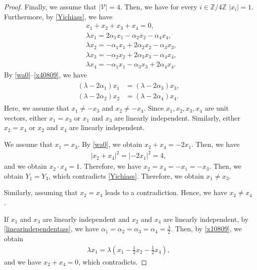 \documentclass[10pt,a4paper]{amsart}
\numberwithin{equation}{section}
\begin{document}
\begin{proof}
Finally, we assume that $|\mathcal{V}|=4$. Then, we have for every $i\in \mathbb{Z}/4\mathbb{Z}$ $|x_i|=1$. Furthermore, by \eqref{Yichiass}, we have
\begin{align}
&x_1+x_2+x_3+x_4=0, \label{wa0}
\\
&\lambda x_1=2\alpha_1x_1-\alpha_2x_2-\alpha_4x_4, \label{x10809}
\\
&\lambda x_2=-\alpha_1x_1+2\alpha_2x_2-\alpha_3x_3, \label{x20809}
\\
&\lambda x_3=-\alpha_2x_2+2\alpha_3x_3-\alpha_4x_4, \label{x30809}
\\
&\lambda x_4=-\alpha_1 x_1-\alpha_3x_3+2\alpha_4x_4. \label{x40809}
\end{align}
By \eqref{wa0}--\eqref{x40809}, we have
\begin{align}\label{linearindependentass}
\begin{aligned}
(\lambda-2\alpha_1)x_1&=(\lambda-2\alpha_3)x_3,
\\
(\lambda-2\alpha_2)x_2&=(\lambda-2\alpha_4)x_4.
\end{aligned}
\end{align}
Here, we assume that $x_1\neq -x_3$ and $x_2\neq -x_4$. Since $x_1,x_2,x_3,x_4$ are unit vectors, either $x_1=x_3$ or $x_1$ and $x_3$ are linearly independent. Similarly, either $x_2=x_4$ or $x_2$ and $x_4$ are linearly independent.

We assume that $x_1=x_3$. By \eqref{wa0}, we obtain $x_2+x_4=-2x_1$. Then, we have
\begin{align*}
\left|x_2+x_4\right|^2=\left|-2x_1\right|^2=4,
\end{align*}
and we obtain $x_2\cdot x_4=1$. Therefore, we have $x_2=x_4=-x_1=-x_3$. Then, we obtain $Y_1=Y_3$, which contradicts \eqref{Yichiass}. Therefore, we obtain $x_1\neq x_3$.

Similarly, assuming that $x_2=x_4$ leads to a contradiction. Hence, we have $x_2\neq x_4$.


If $x_1$ and $x_3$ are linearly independent and $x_2$ and $x_4$ are linearly independent, by \eqref{linearindependentass}, we have $\alpha_1=\alpha_2=\alpha_3=\alpha_4=\frac{\lambda}{2}$. Then, by \eqref{x10809}, we obtain
\begin{align*}
\lambda x_1=\lambda\left(x_1-\frac{1}{2}x_2-\frac{1}{2}x_4\right),
\end{align*}
and we have $x_2+x_4=0$, which contradicts.



\end{proof}
\end{document}
